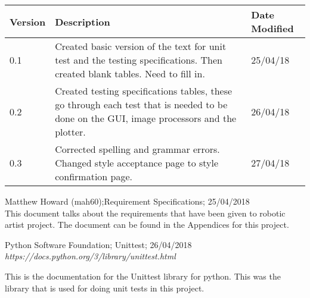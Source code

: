 \documentclass{article}
\begin{document}
\begin{center}

\begin{tabular}{| l | p{8cm} | p{3cm}|}

\hline

\textbf{Version} & \textbf{Description} & \textbf{Date Modified} \\\hline

0.1 & Created basic version of the text for unit test and the testing specifications. Then created blank tables. Need to fill in. & 25/04/18 \\ \hline
0.2 & Created testing specifications tables, these go through each test that is needed to be done on the GUI, image processors and the plotter. & 26/04/18\\ \hline
0.3 & Corrected spelling and grammar errors. Changed style acceptance page to style confirmation page. & 27/04/18\\ \hline


\end{tabular}

    \begin{thebibliography}{9}


    Matthew Howard (mah60);Requirement Specifications; 25/04/2018 \\ 
    
    This document talks about the requirements that have been given to robotic artist project. The document can be found in the Appendices for this project.\\ 
    
    
    Python Software Foundation; Unittest; 26/04/2018\\
    
    \textit{https://docs.python.org/3/library/unittest.html}
    
    This is the documentation for the Unittest library for python. This was the library that is used for doing unit tests in this project.
    \end{thebibliography}

\end{center}

 
\end{document}
